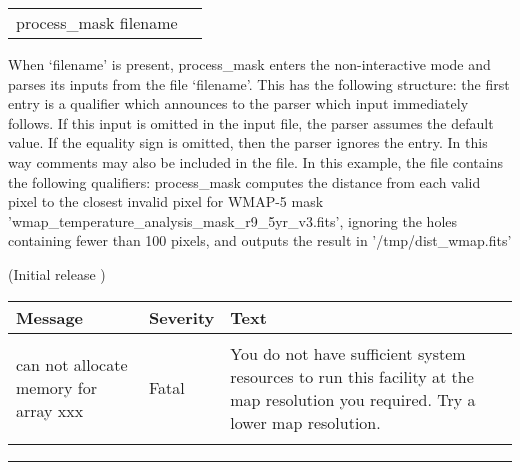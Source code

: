 \vfill\newpage

\begin{examples}{2}
{
\begin{tabular}{ll} %
process\_mask  filename \\
\end{tabular}
}
{When `filename' is present, process\_mask enters the non-interactive mode and parses
its inputs from the file `filename'. This has the following
structure: the first entry is a qualifier which announces to the parser
which input immediately follows. If this input is omitted in the
input file, the parser assumes the default value.
If the equality sign is omitted, then the parser ignores the entry.
In this way comments may also be included in the file.
In this example, the file contains the following qualifiers:\hfill\newline
{}
}
process\_mask computes the distance from each valid pixel to the closest invalid
pixel for WMAP-5 mask 'wmap\_temperature\_analysis\_mask\_r9\_5yr\_v3.fits', ignoring
the holes containing fewer than 100 pixels, and outputs the result in '/tmp/dist\_wmap.fits'
\end{examples}

\begin{release}
  \begin{relist}
    \item (Initial release )
  \end{relist}
\end{release}

\begin{messages}
{
\begin{tabular}{p{0.25\hsize} p{0.1\hsize} p{0.35\hsize}} \hline  
  \textbf{Message} & \textbf{Severity} & \textbf{Text} \\ \hline
                   &                   &   \\ %
can not allocate memory for array xxx &  Fatal & You do not have
                   sufficient system resources to run this
                   facility at the map resolution you required. 
  Try a lower map resolution.  \\ 
                   &                   &   \\ \hline %
\end{tabular}
} 
\end{messages}

\rule{\hsize}{2mm}

\newpage
